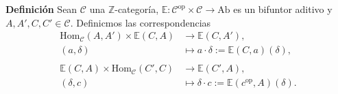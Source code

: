 \documentclass[preview]{standalone}
\begin{document}
\begin{center}
\flushleft \textbf{Definición} Sean $\mathscr{C}$ una $\mathbb{Z}$-categoría, $\mathbb{E}:\mathscr{C}^\text{op}\times\mathscr{C}\to\text{Ab}$ es un bifuntor aditivo y $A,A',C,C'\in\mathscr{C}$. Definicmos las correspondencias \begin{align*} \text{Hom}_\mathscr{C}(A,A')\times\mathbb{E}(C,A) &\to \mathbb{E}(C,A'), \\ (a,\delta) &\mapsto a\cdot\delta:=\mathbb{E}(C,a)(\delta), \\ \\ \mathbb{E}(C,A)\times\text{Hom}_\mathscr{C}(C',C) &\to \mathbb{E}(C',A), \\ (\delta,c) &\mapsto \delta\cdot c:=\mathbb{E}(c^\text{op},A)(\delta). \end{align*}
\end{center}
\end{document}

